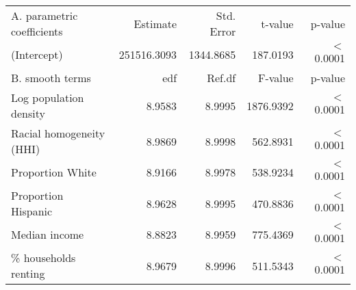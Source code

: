\begin{table}[ht]
\centering
\begin{tabular}{lrrrr}
   \hline
A. parametric coefficients & Estimate & Std. Error & t-value & p-value \\ 
  (Intercept) & 251516.3093 & 1344.8685 & 187.0193 & $<$ 0.0001 \\ 
   \hline
B. smooth terms & edf & Ref.df & F-value & p-value \\ 
  Log population density & 8.9583 & 8.9995 & 1876.9392 & $<$ 0.0001 \\ 
  Racial homogeneity (HHI) & 8.9869 & 8.9998 & 562.8931 & $<$ 0.0001 \\ 
  Proportion White & 8.9166 & 8.9978 & 538.9234 & $<$ 0.0001 \\ 
  Proportion Hispanic & 8.9628 & 8.9995 & 470.8836 & $<$ 0.0001 \\ 
  Median income & 8.8823 & 8.9959 & 775.4369 & $<$ 0.0001 \\ 
  \% households renting & 8.9679 & 8.9996 & 511.5343 & $<$ 0.0001 \\ 
   \hline
\end{tabular}
\caption{ } 
\label{Demographic GAM}
\end{table}
